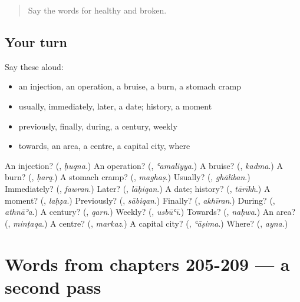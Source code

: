 \label{lesson:AR-R209-first-pass-words-from-chapters-201-204}



\begin{quote}
Say the words for healthy and broken.
\end{quote}

\subsection*{Your turn}
Say these aloud:

\begin{itemize}
\raggedright
  \item an injection, an operation, a bruise, a burn, a stomach cramp
  \item usually, immediately, later, a date; history, a moment
  \item previously, finally, during, a century, weekly
  \item towards, an area, a centre, a capital city, where
\end{itemize}

\begin{tcolorbox}[breakable,colback=teal!4,colframe=teal!35!black,title={Before you move on}]
An injection? (\textbf{}, \emph{ḥuqna}.) An operation? (\textbf{}, \emph{ʿamaliyya}.) A bruise? (\textbf{}, \emph{kadma}.) A burn? (\textbf{}, \emph{ḥarq}.) A stomach cramp? (\textbf{}, \emph{maghaṣ}.) Usually? (\textbf{}, \emph{ghāliban}.) Immediately? (\textbf{}, \emph{fawran}.) Later? (\textbf{}, \emph{lāḥiqan}.) A date; history? (\textbf{}, \emph{tārīkh}.) A moment? (\textbf{}, \emph{laḥẓa}.) Previously? (\textbf{}, \emph{sābiqan}.) Finally? (\textbf{}, \emph{akhīran}.) During? (\textbf{}, \emph{athnāʾa}.) A century? (\textbf{}, \emph{qarn}.) Weekly? (\textbf{}, \emph{usbūʿī}.) Towards? (\textbf{}, \emph{naḥwa}.) An area? (\textbf{}, \emph{minṭaqa}.) A centre? (\textbf{}, \emph{markaz}.) A capital city? (\textbf{}, \emph{ʿāṣima}.) Where? (\textbf{}, \emph{ayna}.)
\end{tcolorbox}
\section[(dialogue)]{Words from chapters 205-209 — a second pass}

\label{lesson:AR-R209-second-pass-words-from-chapters-205-209}



